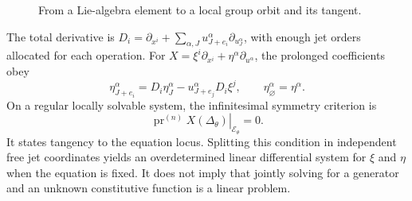 \documentclass[11pt,a4paper,oneside]{report}
\numberwithin{equation}{chapter}
\newcommand{\E}{\mathcal E}
\newcommand{\pr}{\operatorname{pr}}
\begin{document}
\begin{figure}[htbp]\centering
{}
\caption{From a Lie-algebra element to a local group orbit and its tangent.}\label{fig:group}
\end{figure}

The total derivative is $D_i=\partial_{x^i}+\sum_{\alpha,J}u^\alpha_{J+e_i}\partial_{u^\alpha_J}$, with enough jet orders allocated for each operation. For $X=\xi^i\partial_{x^i}+\eta^\alpha\partial_{u^\alpha}$, the prolonged coefficients obey
\begin{equation}\label{eq:prolong}
\eta^\alpha_{J+e_i}=D_i\eta^\alpha_J-u^\alpha_{J+e_j}D_i\xi^j,
\qquad \eta^\alpha_\varnothing=\eta^\alpha.
\end{equation}
On a regular locally solvable system, the infinitesimal symmetry criterion is \cite{olver1986,oliveri2026}
\begin{equation}\label{eq:criterion}
\left.\pr^{(n)}X(\Delta_\theta)\right|_{\E_\theta}=0.
\end{equation}
It states tangency to the equation locus. Splitting this condition in independent free jet coordinates yields an overdetermined linear differential system for $\xi$ and $\eta$ when the equation is fixed. It does not imply that jointly solving for a generator and an unknown constitutive function is a linear problem.
\end{document}
